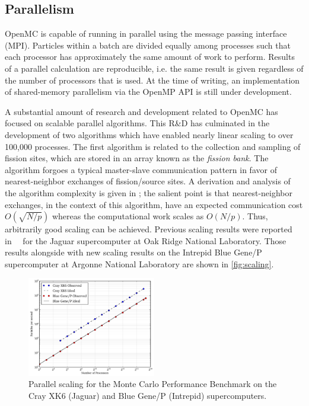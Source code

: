 \documentclass[5p,authoryear]{elsarticle}
\begin{document}
\subsection{Parallelism}

OpenMC is capable of running in parallel using the message passing interface
(MPI). Particles within a batch are divided equally among processes such that
each processor has approximately the same amount of work to perform. Results of
a parallel calculation are reproducible, i.e. the same result is given
regardless of the number of processors that is used. At the time of writing, an
implementation of shared-memory parallelism via the OpenMP API is still under
development.

A substantial amount of research and development related to OpenMC has focused
on scalable parallel algorithms. This R\&D has culminated in the development of
two algorithms which have enabled nearly linear scaling to over 100,000
processes. The first algorithm is related to the collection and sampling of
fission sites, which are stored in an array known as the \textit{fission
  bank}. The algorithm forgoes a typical master-slave communication pattern in
favor of nearest-neighbor exchanges of fission/source sites. A derivation and
analysis of the algorithm complexity is given in \citet{nse-romano-2012}; the
salient point is that nearest-neighbor exchanges, in the context of this
algorithm, have an expected communication cost $O(\sqrt{N/p})$ whereas the
computational work scales as $O(N/p)$. Thus, arbitrarily good scaling can be
achieved. Previous scaling results were reported in~~\citep{ane-romano-2013} for
the Jaguar supercomputer at Oak Ridge National Laboratory. Those results
alongside with new scaling results on the Intrepid Blue Gene/P supercomputer at
Argonne National Laboratory are shown in \autoref{fig:scaling}.
\begin{figure}[htb]
  \centering
  \includegraphics[width=0.5\textwidth]{images/scaling_loglog.pdf}
  \caption{Parallel scaling for the Monte Carlo Performance Benchmark on the
    Cray XK6 (Jaguar) and Blue Gene/P (Intrepid) supercomputers.}
  \label{fig:scaling}
\end{figure}
\end{document}
